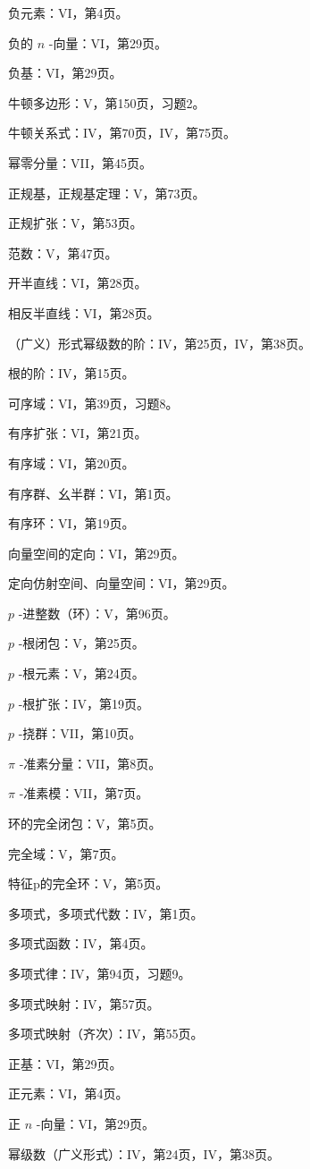 负元素：VI，第4页。

负的 \(n\) -向量：VI，第29页。

负基：VI，第29页。

牛顿多边形：V，第150页，习题2。

牛顿关系式：IV，第70页，IV，第75页。

幂零分量：VII，第45页。

正规基，正规基定理：V，第73页。

正规扩张：V，第53页。

范数：V，第47页。

开半直线：VI，第28页。

相反半直线：VI，第28页。

（广义）形式幂级数的阶：IV，第25页，IV，第38页。

根的阶：IV，第15页。

可序域：VI，第39页，习题8。

有序扩张：VI，第21页。

有序域：VI，第20页。

有序群、幺半群：VI，第1页。

有序环：VI，第19页。

向量空间的定向：VI，第29页。

定向仿射空间、向量空间：VI，第29页。

\(p\) -进整数（环）：V，第96页。

\(p\) -根闭包：V，第25页。

\(p\) -根元素：V，第24页。

\(p\) -根扩张：IV，第19页。

\(p\) -挠群：VII，第10页。

\(\pi\) -准素分量：VII，第8页。

\(\pi\) -准素模：VII，第7页。

环的完全闭包：V，第5页。

完全域：V，第7页。

特征p的完全环：V，第5页。

多项式，多项式代数：IV，第1页。

多项式函数：IV，第4页。

多项式律：IV，第94页，习题9。

多项式映射：IV，第57页。

多项式映射（齐次）：IV，第55页。

正基：VI，第29页。

正元素：VI，第4页。

正 \(n\) -向量：VI，第29页。

幂级数（广义形式）：IV，第24页，IV，第38页。

